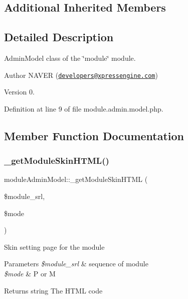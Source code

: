 \subsection*{Additional Inherited Members}


\subsection{Detailed Description}
Admin\+Model class of the \char`\"{}module\char`\"{} module. 

\begin{DoxyAuthor}{Author}
N\+A\+V\+ER (\href{mailto:developers@xpressengine.com}{\tt developers@xpressengine.\+com}) 
\end{DoxyAuthor}
\begin{DoxyVersion}{Version}
0. 
\end{DoxyVersion}


Definition at line 9 of file module.\+admin.\+model.\+php.



\subsection{Member Function Documentation}
\hypertarget{classmoduleAdminModel_ac69c4e024dcabbcaa3f7a13a4c61af04}{}\label{classmoduleAdminModel_ac69c4e024dcabbcaa3f7a13a4c61af04} 
\subsubsection{\texorpdfstring{\+\_\+get\+Module\+Skin\+H\+T\+M\+L()}{\_getModuleSkinHTML()}}
{\footnotesize\ttfamily module\+Admin\+Model\+::\+\_\+get\+Module\+Skin\+H\+T\+ML (\begin{DoxyParamCaption}\item[{}]{\$module\+\_\+srl,  }\item[{}]{\$mode }\end{DoxyParamCaption})}

Skin setting page for the module


\begin{DoxyParams}{Parameters}
{\em \$module\+\_\+srl} & sequence of module \\
\hline
{\em \$mode} & P or M \\
\hline
\end{DoxyParams}
\begin{DoxyReturn}{Returns}
string The H\+T\+ML code 
\end{DoxyReturn}


